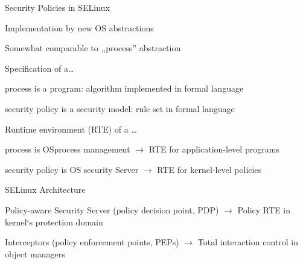 \documentclass[a4paper]{article}
\begin{document}
\begin{multicols}{3}
    Security Policies in SELinux
    \begin{itemize*}
        \item Implementation by new OS abstractions
        \item Somewhat comparable to ,,process'' abstraction
        \item Specification of a\dots
        \begin{itemize*}
            \item process is a program: algorithm implemented in formal language
            \item security policy is a security model: rule set in formal language
        \end{itemize*}
        \item Runtime environment (RTE) of a \dots
        \begin{itemize*}
            \item process is OSprocess management $\rightarrow$ RTE for application-level programs
            \item security policy is OS security Server $\rightarrow$ RTE for kernel-level policies
        \end{itemize*}
    \end{itemize*}

    SELinux Architecture
    \begin{itemize*}
        \item Policy-aware Security Server (policy decision point, PDP) $\rightarrow$ Policy RTE in kernel‘s protection domain
        \item Interceptors (policy enforcement points, PEPs) $\rightarrow$ Total interaction control in object managers
    \end{itemize*}


\end{multicols}
\end{document}
